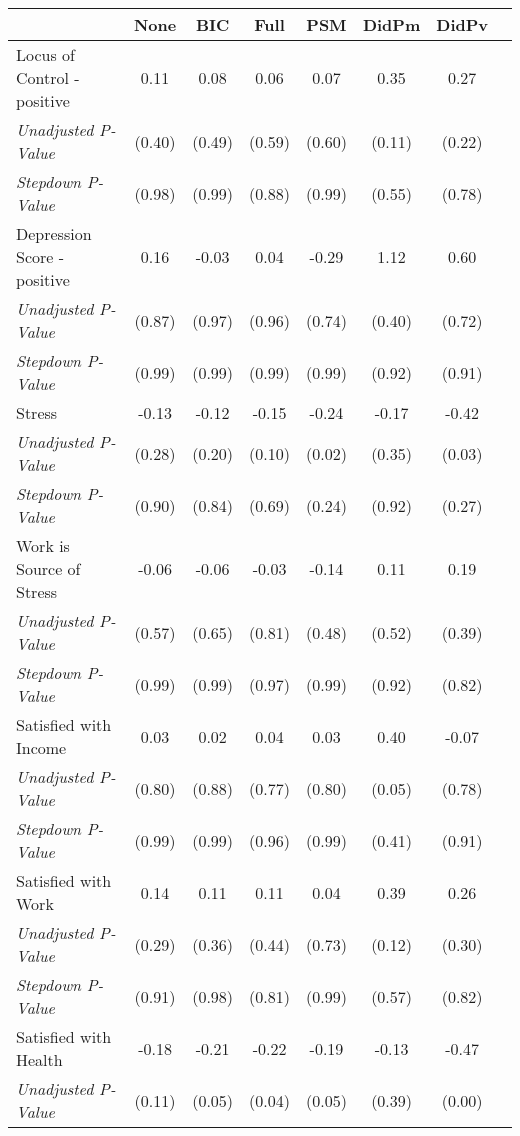 \begin{tabular}{l c c c c c c c}
\toprule
 & None & BIC & Full & PSM & DidPm & DidPv \\
\midrule
Locus of Control - positive & 0.11 & 0.08 & 0.06 & 0.07 & 0.35 & 0.27 \\
\quad \textit{Unadjusted P-Value} & (0.40) & (0.49) & (0.59) & (0.60) & (0.11) & (0.22) \\
\quad \textit{Stepdown P-Value} & (0.98) & (0.99) & (0.88) & (0.99) & (0.55) & (0.78) \\
Depression Score - positive & 0.16 & -0.03 & 0.04 & -0.29 & 1.12 & 0.60 \\
\quad \textit{Unadjusted P-Value} & (0.87) & (0.97) & (0.96) & (0.74) & (0.40) & (0.72) \\
\quad \textit{Stepdown P-Value} & (0.99) & (0.99) & (0.99) & (0.99) & (0.92) & (0.91) \\
Stress & -0.13 & -0.12 & -0.15 & -0.24 & -0.17 & -0.42 \\
\quad \textit{Unadjusted P-Value} & (0.28) & (0.20) & (0.10) & (0.02) & (0.35) & (0.03) \\
\quad \textit{Stepdown P-Value} & (0.90) & (0.84) & (0.69) & (0.24) & (0.92) & (0.27) \\
Work is Source of Stress & -0.06 & -0.06 & -0.03 & -0.14 & 0.11 & 0.19 \\
\quad \textit{Unadjusted P-Value} & (0.57) & (0.65) & (0.81) & (0.48) & (0.52) & (0.39) \\
\quad \textit{Stepdown P-Value} & (0.99) & (0.99) & (0.97) & (0.99) & (0.92) & (0.82) \\
Satisfied with Income & 0.03 & 0.02 & 0.04 & 0.03 & 0.40 & -0.07 \\
\quad \textit{Unadjusted P-Value} & (0.80) & (0.88) & (0.77) & (0.80) & (0.05) & (0.78) \\
\quad \textit{Stepdown P-Value} & (0.99) & (0.99) & (0.96) & (0.99) & (0.41) & (0.91) \\
Satisfied with Work & 0.14 & 0.11 & 0.11 & 0.04 & 0.39 & 0.26 \\
\quad \textit{Unadjusted P-Value} & (0.29) & (0.36) & (0.44) & (0.73) & (0.12) & (0.30) \\
\quad \textit{Stepdown P-Value} & (0.91) & (0.98) & (0.81) & (0.99) & (0.57) & (0.82) \\
Satisfied with Health & -0.18 & -0.21 & -0.22 & -0.19 & -0.13 & -0.47 \\
\quad \textit{Unadjusted P-Value} & (0.11) & (0.05) & (0.04) & (0.05) & (0.39) & (0.00) \\

\end{tabular}
